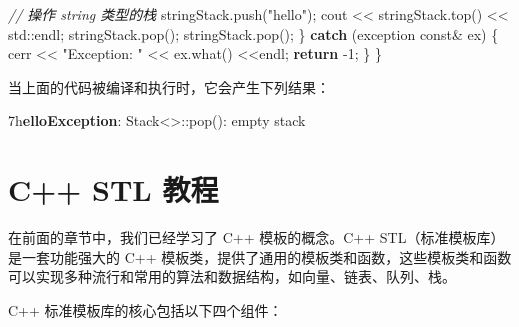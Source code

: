 \documentclass[
]{article}
\newenvironment{Shaded}{}{}
\newcommand{\AttributeTok}[1]{\textcolor[rgb]{0.49,0.56,0.16}{#1}}
\newcommand{\BuiltInTok}[1]{#1}
\newcommand{\CommentTok}[1]{\textcolor[rgb]{0.38,0.63,0.69}{\textit{#1}}}
\newcommand{\ControlFlowTok}[1]{\textcolor[rgb]{0.00,0.44,0.13}{\textbf{#1}}}
\newcommand{\DecValTok}[1]{\textcolor[rgb]{0.25,0.63,0.44}{#1}}
\newcommand{\ErrorTok}[1]{\textcolor[rgb]{1.00,0.00,0.00}{\textbf{#1}}}
\newcommand{\NormalTok}[1]{#1}
\newcommand{\OperatorTok}[1]{\textcolor[rgb]{0.40,0.40,0.40}{#1}}
\newcommand{\StringTok}[1]{\textcolor[rgb]{0.25,0.44,0.63}{#1}}
\begin{document}
\begin{Shaded}
\begin{Highlighting}[]
        \CommentTok{// 操作 string 类型的栈 }
\NormalTok{        stringStack}\OperatorTok{.}\NormalTok{push}\OperatorTok{(}\StringTok{"hello"}\OperatorTok{);} 
\NormalTok{        cout }\OperatorTok{\textless{}\textless{}}\NormalTok{ stringStack}\OperatorTok{.}\NormalTok{top}\OperatorTok{()} \OperatorTok{\textless{}\textless{}} \BuiltInTok{std::}\NormalTok{endl}\OperatorTok{;} 
\NormalTok{        stringStack}\OperatorTok{.}\NormalTok{pop}\OperatorTok{();} 
\NormalTok{        stringStack}\OperatorTok{.}\NormalTok{pop}\OperatorTok{();} 
    \OperatorTok{\}} 
    \ControlFlowTok{catch} \OperatorTok{(}\NormalTok{exception }\AttributeTok{const}\OperatorTok{\&}\NormalTok{ ex}\OperatorTok{)} \OperatorTok{\{} 
\NormalTok{        cerr }\OperatorTok{\textless{}\textless{}} \StringTok{"Exception: "} \OperatorTok{\textless{}\textless{}}\NormalTok{ ex}\OperatorTok{.}\NormalTok{what}\OperatorTok{()} \OperatorTok{\textless{}\textless{}}\NormalTok{endl}\OperatorTok{;} 
        \ControlFlowTok{return} \OperatorTok{{-}}\DecValTok{1}\OperatorTok{;}
    \OperatorTok{\}} 
\OperatorTok{\}}
\end{Highlighting}
\end{Shaded}

当上面的代码被编译和执行时，它会产生下列结果：

\begin{Shaded}
\begin{Highlighting}[]
\DecValTok{7}\BuiltInTok{h}\ErrorTok{elloException}\OperatorTok{:}\NormalTok{ Stack}\OperatorTok{\textless{}\textgreater{}::}\NormalTok{pop}\OperatorTok{():}\NormalTok{ empty stack}
\end{Highlighting}
\end{Shaded}

\hypertarget{c-stl-ux6559ux7a0b}{%
\section{C++ STL 教程}\label{c-stl-ux6559ux7a0b}}

在前面的章节中，我们已经学习了 C++ 模板的概念。C++
STL（标准模板库）是一套功能强大的 C++
模板类，提供了通用的模板类和函数，这些模板类和函数可以实现多种流行和常用的算法和数据结构，如向量、链表、队列、栈。

C++ 标准模板库的核心包括以下四个组件：
\end{document}
